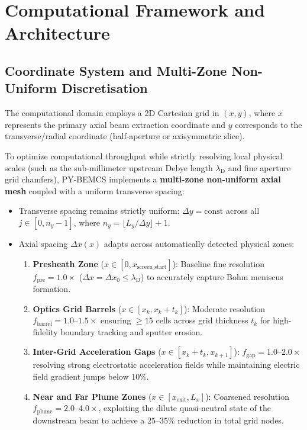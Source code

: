\documentclass[11pt,a4paper]{article}
\newcommand{\PYBEMCS}{PY-BEMCS}
\begin{document}
\tableofcontents
\newpage

\section{Computational Framework and Architecture}

\subsection{Coordinate System and Multi-Zone Non-Uniform Discretisation}

The computational domain employs a 2D Cartesian grid in $(x, y)$, where $x$ represents the primary axial beam extraction coordinate and $y$ corresponds to the transverse/radial coordinate (half-aperture or axisymmetric slice). 

To optimize computational throughput while strictly resolving local physical scales (such as the sub-millimeter upstream Debye length $\lambda_{\mathrm{D}}$ and fine aperture grid chamfers), \PYBEMCS{} implements a \textbf{multi-zone non-uniform axial mesh} coupled with a uniform transverse spacing:
\begin{itemize}[nosep]
    \item Transverse spacing remains strictly uniform: $\Delta y = \text{const}$ across all $j \in [0, n_y - 1]$, where $n_y = \lfloor L_y / \Delta y \rfloor + 1$.
    \item Axial spacing $\Delta x(x)$ adapts across automatically detected physical zones:
    \begin{enumerate}[nosep]
        \item \textbf{Presheath Zone} ($x \in [0, x_{\mathrm{screen\_start}}]$): Baseline fine resolution $f_{\mathrm{pre}} = 1.0\times$ ($\Delta x = \Delta x_0 \le \lambda_{\mathrm{D}}$) to accurately capture Bohm meniscus formation.
        \item \textbf{Optics Grid Barrels} ($x \in [x_k, x_k + t_k]$): Moderate resolution $f_{\mathrm{barrel}} = 1.0\text{--}1.5\times$ ensuring $\ge 15$ cells across grid thickness $t_k$ for high-fidelity boundary tracking and sputter erosion.
        \item \textbf{Inter-Grid Acceleration Gaps} ($x \in [x_k + t_k, x_{k+1}]$): $f_{\mathrm{gap}} = 1.0\text{--}2.0\times$ resolving strong electrostatic acceleration fields while maintaining electric field gradient jumps below $10\%$.
        \item \textbf{Near and Far Plume Zones} ($x \in [x_{\mathrm{exit}}, L_x]$): Coarsened resolution $f_{\mathrm{plume}} = 2.0\text{--}4.0\times$, exploiting the dilute quasi-neutral state of the downstream beam to achieve a $25\text{--}35\%$ reduction in total grid nodes.
    \end{enumerate}
\end{itemize}
\end{document}
